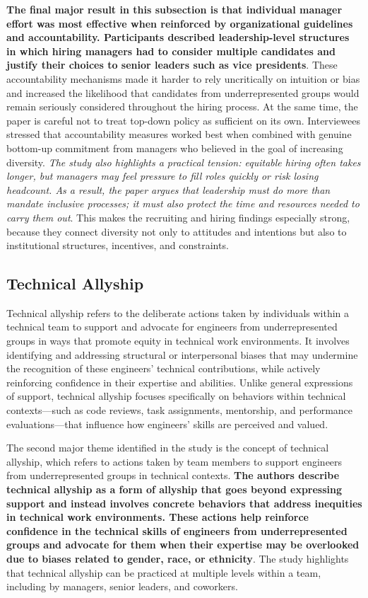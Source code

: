 \textbf{The final major result in this subsection is that individual manager effort was most effective when reinforced by organizational guidelines and accountability. Participants described leadership-level structures in which hiring managers had to consider multiple candidates and justify their choices to senior leaders such as vice presidents}. These accountability mechanisms made it harder to rely uncritically on intuition or bias and increased the likelihood that candidates from underrepresented groups would remain seriously considered throughout the hiring process. At the same time, the paper is careful not to treat top-down policy as sufficient on its own. Interviewees stressed that accountability measures worked best when combined with genuine bottom-up commitment from managers who believed in the goal of increasing diversity. \textit{The study also highlights a practical tension: equitable hiring often takes longer, but managers may feel pressure to fill roles quickly or risk losing headcount. As a result, the paper argues that leadership must do more than mandate inclusive processes; it must also protect the time and resources needed to carry them out}. This makes the recruiting and hiring findings especially strong, because they connect diversity not only to attitudes and intentions but also to institutional structures, incentives, and constraints.

\subsection{Technical Allyship}

\begin{definition}
    Technical allyship refers to the deliberate actions taken by individuals within a technical team to support and advocate for engineers from underrepresented groups in ways that promote equity in technical work environments. It involves identifying and addressing structural or interpersonal biases that may undermine the recognition of these engineers’ technical contributions, while actively reinforcing confidence in their expertise and abilities. Unlike general expressions of support, technical allyship focuses specifically on behaviors within technical contexts—such as code reviews, task assignments, mentorship, and performance evaluations—that influence how engineers’ skills are perceived and valued.
\end{definition}

The second major theme identified in the study is the concept of technical allyship, which refers to actions taken by team members to support engineers from underrepresented groups in technical contexts. \textbf{The authors describe technical allyship as a form of allyship that goes beyond expressing support and instead involves concrete behaviors that address inequities in technical work environments. These actions help reinforce confidence in the technical skills of engineers from underrepresented groups and advocate for them when their expertise may be overlooked due to biases related to gender, race, or ethnicity}. The study highlights that technical allyship can be practiced at multiple levels within a team, including by managers, senior leaders, and coworkers.

